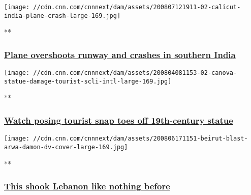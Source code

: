 \href{/videos/world/2020/08/07/plane-crash-kozhikode-international-airport-air-india-express-vedika-sud-intl-vpx.cnn/video/playlists/around-the-world/}{}

\texttt{[image: //cdn.cnn.com/cnnnext/dam/assets/200807121911-02-calicut-india-plane-crash-large-169.jpg]}

**

\hypertarget{plane-overshoots-runway-and-crashes-in-southern-india}{%
\subsubsection{\texorpdfstring{\href{/videos/world/2020/08/07/plane-crash-kozhikode-international-airport-air-india-express-vedika-sud-intl-vpx.cnn/video/playlists/around-the-world/}{Plane
overshoots runway and crashes in southern
India}}{Plane overshoots runway and crashes in southern India}}\label{plane-overshoots-runway-and-crashes-in-southern-india}}

\href{/videos/arts/2020/08/04/tourist-breaks-statue-italy-orig-mrg.cnn/video/playlists/around-the-world/}{}

\texttt{[image: //cdn.cnn.com/cnnnext/dam/assets/200804081153-02-canova-statue-damage-tourist-scli-intl-large-169.jpg]}

**

\hypertarget{watch-posing-tourist-snap-toes-off-19th-century-statue}{%
\subsubsection{\texorpdfstring{\href{/videos/arts/2020/08/04/tourist-breaks-statue-italy-orig-mrg.cnn/video/playlists/around-the-world/}{Watch
posing tourist snap toes off 19th-century
statue}}{Watch posing tourist snap toes off 19th-century statue}}\label{watch-posing-tourist-snap-toes-off-19th-century-statue}}

\href{/videos/world/2020/08/06/beirut-explosion-arwa-damon-lon-orig.cnn/video/playlists/around-the-world/}{}

\texttt{[image: //cdn.cnn.com/cnnnext/dam/assets/200806171151-beirut-blast-arwa-damon-dv-cover-large-169.jpg]}

**

\hypertarget{this-shook-lebanon-like-nothing-before}{%
\subsubsection{\texorpdfstring{\href{/videos/world/2020/08/06/beirut-explosion-arwa-damon-lon-orig.cnn/video/playlists/around-the-world/}{This
shook Lebanon like nothing
before}}{This shook Lebanon like nothing before}}\label{this-shook-lebanon-like-nothing-before}}

